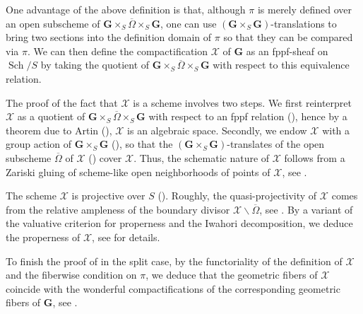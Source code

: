 \documentclass[11pt, reqno]{amsart}
\theoremstyle{plain}
\theoremstyle{definition}
\DeclareMathOperator{\Sch}{Sch}
\begin{document}
One advantage of the above definition is that, although $\pi$ is merely defined over an open subscheme of $\mathbf{G}\times_S\overline{\Omega}\times_S\mathbf{G}$, one can use $(\mathbf{G}\times_S \mathbf{G})$-translations to bring two sections into the definition domain of $\pi$ so that they can be compared via $\pi$. We can then define the compactification $\mathcal{X}$ of $\mathbf{G}$ as an fppf-sheaf on $\Sch/S$ by taking the quotient of $\mathbf{G}\times_S\overline{\Omega}\times_S \mathbf{G}$ with respect to this equivalence relation. 

The proof of the fact that $\mathcal{X}$ is a scheme involves two steps. We first reinterpret $\mathcal{X}$ as a quotient of $\mathbf{G}\times_S\overline{\Omega}\times_S\mathbf{G}$ with respect to an fppf relation (), hence by a theorem due to Artin (\cite[Corollaire (10.4)]{Champsalgebrique}), $\mathcal{X}$ is an algebraic space. Secondly, we endow $\mathcal{X}$ with a group action of $\mathbf{G}\times_S\mathbf{G}$ (), so that the $(\mathbf{G}\times_S\mathbf{G})$-translates of the open subscheme $\overline{\Omega}$ of $\mathcal{X}$ () cover $\mathcal{X}$. Thus, the schematic nature of $\mathcal{X}$ follows from a Zariski gluing of scheme-like open neighborhoods of points of $\mathcal{X}$, see \cite[Section~6.6, Theorem~2]{BLR}.

The scheme $\mathcal{X}$ is projective over $S$ ().
Roughly, the quasi-projectivity of $\mathcal{X}$ comes from the relative ampleness of the boundary divisor $\mathcal{X}\backslash \overline{\Omega}$, see \cite[Section~6.6, Theorem~2 (d)]{BLR}. By a variant of the valuative criterion for properness and the Iwahori decomposition, we deduce the properness of $\mathcal{X}$, see  for details.

To finish the proof of  in the split case,  by the functoriality of the definition of $\mathcal{X}$ and the fiberwise condition on $\pi$, we deduce that the geometric fibers of $\mathcal{X}$ coincide with the wonderful compactifications of the corresponding geometric fibers of $\mathbf{G}$, see .
\end{document}
